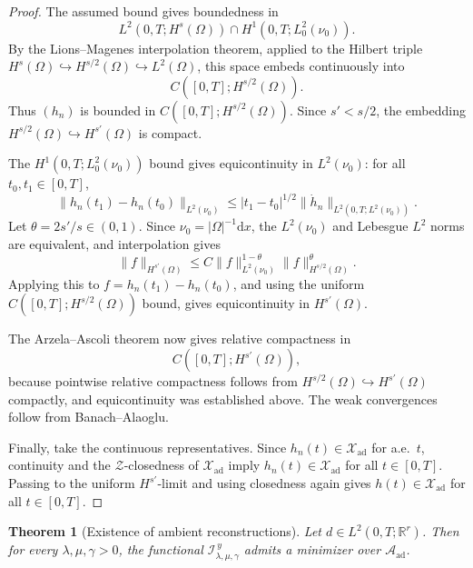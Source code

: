 \documentclass{article}
\newtheorem{theorem}{Theorem}[section]
\theoremstyle{definition}
\renewcommand{\d}{\mathrm{d}}
\begin{document}
\begin{proof}
    The assumed bound gives boundedness in
    \[
        L^2(0,T;H^s(\Omega))\cap H^1(0,T;L^2_0(\nu_0)).
    \]
    By the Lions--Magenes interpolation theorem, applied to the Hilbert triple
    \(H^s(\Omega)\hookrightarrow H^{s/2}(\Omega)\hookrightarrow L^2(\Omega)\), this space embeds
    continuously into
    \[
        C([0,T];H^{s/2}(\Omega)).
    \]
    Thus \((h_n)\) is bounded in \(C([0,T];H^{s/2}(\Omega))\). Since \(s'<s/2\), the embedding
    \(H^{s/2}(\Omega)\hookrightarrow H^{s'}(\Omega)\) is compact.

    The \(H^1(0,T;L^2_0(\nu_0))\) bound gives equicontinuity in \(L^2(\nu_0)\): for all
    \(t_0,t_1\in[0,T]\),
    \[
        \|h_n(t_1)-h_n(t_0)\|_{L^2(\nu_0)}
        \le
        |t_1-t_0|^{1/2}
        \|\dot h_n\|_{L^2(0,T;L^2(\nu_0))}.
    \]
    Let \(\theta=2s'/s\in(0,1)\). Since \(\nu_0=|\Omega|^{-1}\d x\), the \(L^2(\nu_0)\) and
    Lebesgue \(L^2\) norms are equivalent, and interpolation gives
    \[
        \|f\|_{H^{s'}(\Omega)}
        \le
        C\|f\|_{L^2(\nu_0)}^{1-\theta}
        \|f\|_{H^{s/2}(\Omega)}^\theta.
    \]
    Applying this to \(f=h_n(t_1)-h_n(t_0)\), and using the uniform
    \(C([0,T];H^{s/2}(\Omega))\) bound, gives equicontinuity in \(H^{s'}(\Omega)\).

    The Arzela--Ascoli theorem now gives relative compactness in
    \[
        C([0,T];H^{s'}(\Omega)),
    \]
    because pointwise relative compactness follows from
    \(H^{s/2}(\Omega)\hookrightarrow H^{s'}(\Omega)\) compactly, and equicontinuity was established
    above. The weak convergences follow from Banach--Alaoglu.

    Finally, take the continuous representatives. Since \(h_n(t)\in\mathcal X_{\mathrm{ad}}\) for
    a.e.\ \(t\), continuity and the \(\mathcal Z\)-closedness of \(\mathcal X_{\mathrm{ad}}\) imply
    \(h_n(t)\in\mathcal X_{\mathrm{ad}}\) for all \(t\in[0,T]\). Passing to the uniform
    \(H^{s'}\)-limit and using closedness again gives \(h(t)\in\mathcal X_{\mathrm{ad}}\) for all
    \(t\in[0,T]\).
\end{proof}

\begin{theorem}[Existence of ambient reconstructions]
    \label{thm:ambient-existence}
    Let \(d\in L^2(0,T;\mathbb R^r)\). Then for every \(\lambda,\mu,\gamma>0\), the functional
    \(\mathcal I_{\lambda,\mu,\gamma}^{\,y}\) admits a minimizer over \(\mathcal A_{\mathrm{ad}}\).
\end{theorem}
\end{document}
